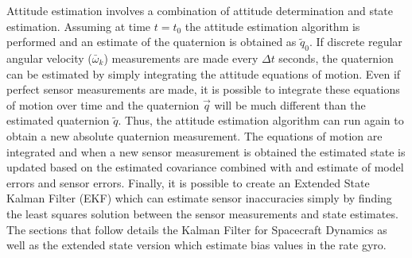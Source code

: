 \documentclass{article}
\begin{document}
Attitude estimation involves a combination of attitude determination
and state estimation. Assuming at time $t=t_0$ the attitude estimation
algorithm is performed and an estimate of the quaternion is obtained
as $\tilde{q}_0$. If discrete regular angular velocity
($\bar{\omega}_{k}$) measurements are made every $\Delta t$ seconds,
the quaternion can be estimated by simply integrating the attitude
equations of motion. Even if perfect sensor measurements are made, it
is possible to integrate these equations of motion over time and the
quaternion $\vec{q}$ will be much different than the estimated
quaternion $\tilde{q}$. Thus, the attitude estimation algorithm can
run again to obtain a new absolute quaternion measurement. The
equations of motion are integrated and when a new sensor measurement
is obtained the estimated state is updated based on the estimated
covariance combined with and estimate of model errors and sensor
errors. Finally, it is possible to 
create an Extended State Kalman Filter (EKF) which can estimate
sensor inaccuracies simply by finding the least squares solution
between the sensor measurements and state estimates. The sections that
follow details the Kalman Filter for Spacecraft Dynamics as well as
the extended state version which estimate bias values in the rate gyro.
  
\end{document}
